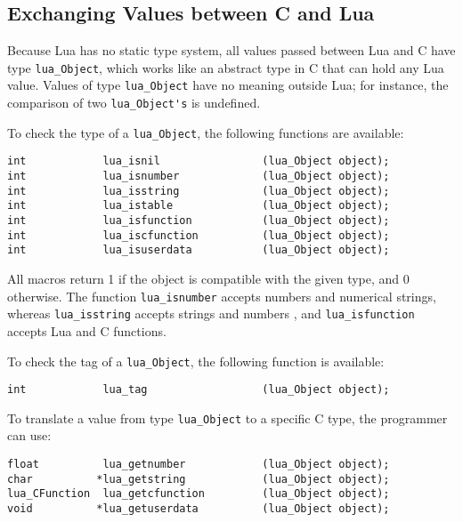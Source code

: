 \subsection{Exchanging Values between C and Lua} \label{valuesCLua}
Because Lua has no static type system,
all values passed between Lua and C have type
\verb|lua_Object|,
which works like an abstract type in C that can hold any Lua value.
Values of type \verb|lua_Object| have no meaning outside Lua;
for instance,
the comparison of two \verb|lua_Object's| is undefined.

To check the type of a \verb|lua_Object|,
the following functions are available:
\begin{verbatim}
int            lua_isnil                (lua_Object object);
int            lua_isnumber             (lua_Object object);
int            lua_isstring             (lua_Object object);
int            lua_istable              (lua_Object object);
int            lua_isfunction           (lua_Object object);
int            lua_iscfunction          (lua_Object object);
int            lua_isuserdata           (lua_Object object);
\end{verbatim}
All macros return 1 if the object is compatible with the given type,
and 0 otherwise.
The function \verb|lua_isnumber| accepts numbers and numerical strings,
whereas
\verb|lua_isstring| accepts strings and numbers ,
and \verb|lua_isfunction| accepts Lua and C functions.

To check the tag of a \verb|lua_Object|,
the following function is available:
\begin{verbatim}
int            lua_tag                  (lua_Object object);
\end{verbatim}

To translate a value from type \verb|lua_Object| to a specific C type,
the programmer can use:
\begin{verbatim}
float          lua_getnumber            (lua_Object object);
char          *lua_getstring            (lua_Object object);
lua_CFunction  lua_getcfunction         (lua_Object object);
void          *lua_getuserdata          (lua_Object object);
\end{verbatim}


